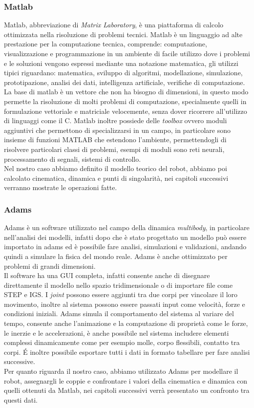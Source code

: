 \subsubsection{Matlab}
Matlab, abbreviazione di \textit{Matrix Laboratory}, è una piattaforma di calcolo ottimizzata nella risoluzione di problemi tecnici. 
Matlab è un linguaggio ad alte prestazione per la computazione tecnica, comprende: computazione, visualizzazione e programmazione in un ambiente di facile utilizzo dove i problemi e le soluzioni vengono espressi mediante una notazione matematica, gli utilizzi tipici riguardano: matematica, sviluppo di algoritmi, modellazione, simulazione, prototipazione, analisi dei dati, intelligenza artificiale, verifiche di computazione. La base di matlab è un vettore che non ha bisogno di dimensioni, in questo modo permette la risoluzione di molti problemi di computazione, specialmente quelli in formulazione vettoriale e matriciale velocemente, senza dover ricorrere all'utilizzo di linguaggi come il C. Matlab inoltre possiede delle \textit{toolbox} ovvero moduli aggiuntivi che permettono di specializzarsi in un campo, in particolare sono insieme di funzioni MATLAB che estendono l'ambiente, permettendogli di risolvere particolari classi di problemi, esempi di moduli sono reti neurali, processamento di segnali, sistemi di controllo.
\\Nel nostro caso abbiamo definito il modello teorico del robot, abbiamo poi calcolato cinematica, dinamica e punti di singolarità, nei capitoli successivi verranno mostrate le operazioni fatte. 
\subsubsection{Adams}
Adams è un software utilizzato nel campo della dinamica \textit{multibody}, in particolare nell'analisi dei modelli, infatti dopo che è stato progettato un modello può essere importato in adams ed è possibile fare analisi, simulazioni e validazioni, andando quindi a simulare la fisica del mondo reale. Adams è anche ottimizzato per problemi di grandi dimensioni.
\\Il software ha una GUI completa, infatti consente anche di disegnare direttamente il modello nello spazio tridimensionale o di importare file come STEP e IGS. I \textit{joint} possono essere aggiunti tra due corpi per vincolare il loro movimento, inoltre al sistema possono essere passati input come velocità, forze e condizioni iniziali. Adams simula il comportamento del sistema al variare del tempo, consente anche l'animazione e la computazione di proprietà come le forze, le inerzie e le accelerazioni, è anche possibile nel sistema includere elementi complessi dinamicamente come per esempio molle, corpo flessibili, contatto tra corpi.
É inoltre possibile esportare tutti i dati in formato tabellare per fare analisi successive. 
\\Per quanto riguarda il nostro caso, abbiamo utilizzato Adams per modellare il robot, assegnargli le coppie e confrontare i valori della cinematica e dinamica con quelli ottenuti da Matlab, nei capitoli successivi verrà presentato un confronto tra questi dati.